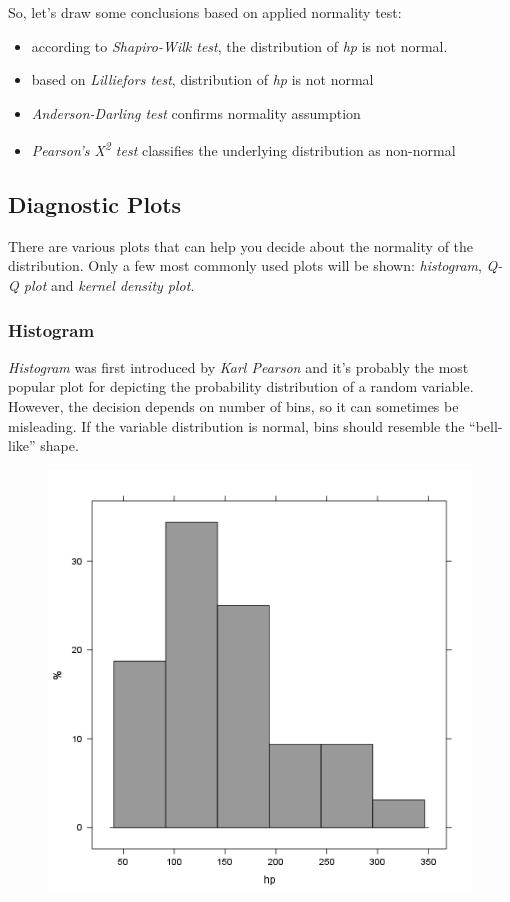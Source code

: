 \documentclass{article}
\makeatletter
\def\maxwidth{\ifdim\Gin@nat@width>\linewidth\linewidth
\else\Gin@nat@width\fi}
\let\Oldincludegraphics\includegraphics
\renewcommand{\includegraphics}[1]{\Oldincludegraphics[width=\maxwidth]{#1}}
\makeatother
\begin{document}
So, let's draw some conclusions based on applied normality test:

\begin{itemize}
\item
  according to \emph{Shapiro-Wilk test}, the distribution of \emph{hp}
  is not normal.
\item
  based on \emph{Lilliefors test}, distribution of \emph{hp} is not
  normal
\item
  \emph{Anderson-Darling test} confirms normality assumption
\item
  \emph{Pearson's Χ\textsuperscript{2} test} classifies the underlying
  distribution as non-normal
\end{itemize}
\subsection{Diagnostic Plots}

There are various plots that can help you decide about the normality of
the distribution. Only a few most commonly used plots will be shown:
\emph{histogram}, \emph{Q-Q plot} and \emph{kernel density plot}.

\subsubsection{Histogram}

\emph{Histogram} was first introduced by \emph{Karl Pearson} and it's
probably the most popular plot for depicting the probability
distribution of a random variable. However, the decision depends on
number of bins, so it can sometimes be misleading. If the variable
distribution is normal, bins should resemble the ``bell-like'' shape.

\begin{figure}[htbp]
\centering
\includegraphics{d90ec4a0af55fabeae7988710a062ce0.png}
\caption{}
\end{figure}
\end{document}
